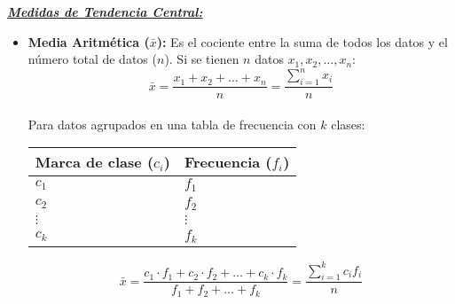 \documentclass[12pt, letterpaper]{article}
\begin{document}
\textbf{\textit{\underline{Medidas de Tendencia Central:}}}
\begin{itemize}
    \item \textbf{Media Aritmética ($\bar{x}$):} Es el cociente entre la suma de todos los datos y el número total de datos ($n$). Si se tienen $n$ datos $x_1, x_2, \dots, x_n$:
        \[ \bar{x}=\frac{x_1+x_2+\dots+x_n}{n} = \frac{\sum_{i=1}^{n} x_i}{n} \] \\ %
    Para datos agrupados en una tabla de frecuencia con $k$ clases:
    \begin{center} %
        \begin{minipage}{0.45\textwidth} %
            \begin{tabularx}{\textwidth}{|X|X|}
                \hline
                \textbf{Marca de clase ($c_i$)} & \textbf{Frecuencia ($f_i$)} \\
                \hline
                $c_1$ & $f_1$ \\
                \hline
                $c_2$ & $f_2$ \\
                \hline
                $\vdots$ & $\vdots$ \\
                \hline
                $c_k$ & $f_k$ \\ %
                \hline
             \end{tabularx}
        \end{minipage}
        \hfill %
        \begin{minipage}{0.45\textwidth} %
            \centering
            \[
            \bar{x}=\frac{c_1 \cdot f_1 + c_2 \cdot f_2 + \dots + c_k \cdot f_k}{f_1+f_2+\dots+f_k} = \frac{\sum_{i=1}^{k} c_i f_i}{n} %
            \]
        \end{minipage}
    \end{center}



\end{itemize}
\end{document}
